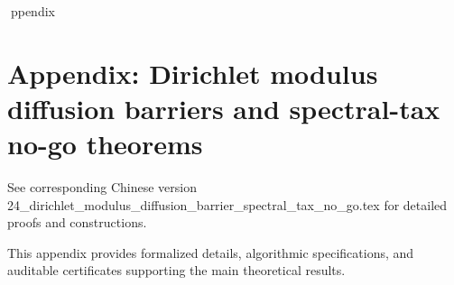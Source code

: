ppendix

\section*{Appendix: Dirichlet modulus diffusion barriers and spectral-tax no-go theorems}

See corresponding Chinese version 24_dirichlet_modulus_diffusion_barrier_spectral_tax_no_go.tex for detailed proofs and constructions.

This appendix provides formalized details, algorithmic specifications, and auditable certificates supporting the main theoretical results.
